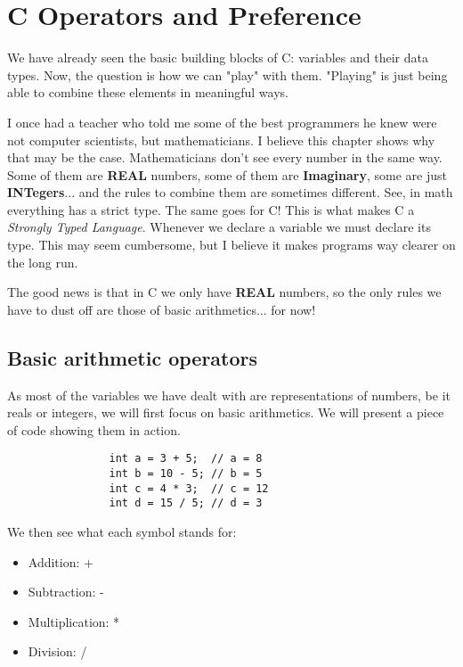 \documentclass[12pt]{book}
\begin{document}
    \chapter{C Operators and Preference}

        We have already seen the basic building blocks of C: variables and their data types. Now, the question is how we can "play" with them. "Playing" is just being able to combine these elements in meaningful ways.

        I once had a teacher who told me some of the best programmers he knew were not computer scientists, but mathematicians. I believe this chapter shows why that may be the case. Mathematicians don't see every number in the same way. Some of them are \textbf{REAL} numbers, some of them are \textbf{Imaginary}, some are just \textbf{INTegers}... and the rules to combine them are sometimes different. See, in math everything has a strict type. The same goes for C! This is what makes C a \textit{Strongly Typed Language}. Whenever we declare a variable we must declare its type. This may seem cumbersome, but I believe it makes programs way clearer on the long run.

        The good news is that in C we only have \textbf{REAL} numbers, so the only rules we have to dust off are those of basic arithmetics... for now!

        \section{Basic arithmetic operators}

            As most of the variables we have dealt with are representations of numbers, be it reals or integers, we will first focus on basic arithmetics. We will present a piece of code showing them in action.

            \begin{verbatim}
                int a = 3 + 5;  // a = 8
                int b = 10 - 5; // b = 5
                int c = 4 * 3;  // c = 12
                int d = 15 / 5; // d = 3
            \end{verbatim}

            We then see what each symbol stands for:

            \begin{itemize}
                \item Addition: +
                \item Subtraction: -
                \item Multiplication: *
                \item Division: /
            \end{itemize}
\end{document}
